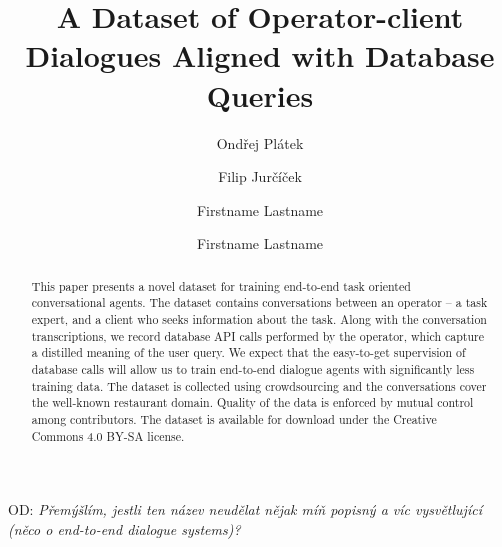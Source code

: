 \documentclass[runningheads,a4paper]{llncs}
\def\OP#1{#1}  %
\def\OD#1{{\color{darkgreen}OD: \it #1}}
\begin{document}


\title{A Dataset of Operator-client Dialogues Aligned with Database Queries}

\author{Ondřej Plátek \and Filip Jurčíček}

\iftrue %
\author{Firstname Lastname \and Firstname Lastname }
\fi
			
\maketitle
\OD{Přemýšlím, jestli ten název neudělat nějak míň popisný a víc vysvětlující (něco o end-to-end dialogue systems)?}

\begin{abstract}
    This paper presents a novel dataset for training end-to-end task oriented conversational agents.
    The dataset contains conversations between an operator – a task expert, and a client who seeks information about the task.
    Along with the conversation transcriptions, we record database API calls performed by the operator, which capture a distilled meaning of the user query.
    We expect that the easy-to-get supervision of database calls will allow us to train end-to-end dialogue agents with significantly less training data.
 	The dataset is collected using crowdsourcing and the conversations cover the well-known restaurant domain.
    Quality of the data is enforced by mutual control among contributors.  %
    The dataset is available for download under the Creative Commons 4.0 BY-SA license.
\end{abstract}
\end{document}

